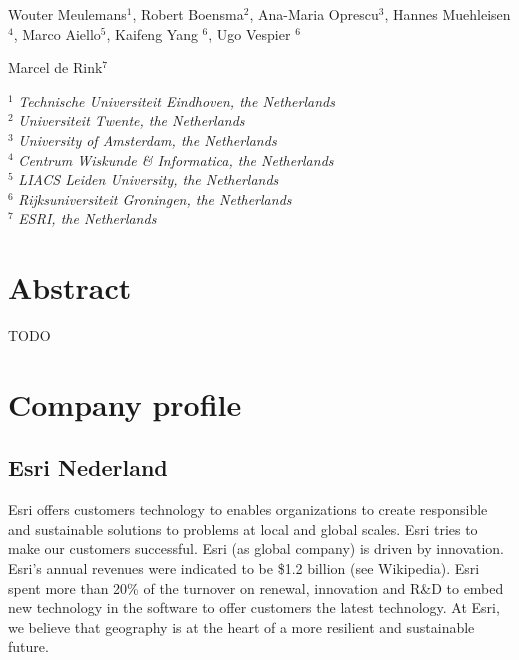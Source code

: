 \documentclass[a4paper,11pt]{article}
\begin{document}

\vspace{0.5em}


\vspace{2em}

\noindent Wouter Meulemans$^1$, Robert Boensma$^2$, Ana-Maria Oprescu$^3$, Hannes Muehleisen$^4$, Marco Aiello$^5$, Kaifeng Yang $^6$, Ugo Vespier $^6$

\vspace{1em}

\noindent Marcel de Rink$^7$

\vspace{1em}

\noindent $^1$ \emph{Technische Universiteit Eindhoven, the Netherlands}\\
\noindent $^2$ \emph{Universiteit Twente, the Netherlands}\\
\noindent $^3$ \emph{University of Amsterdam, the Netherlands}\\
\noindent $^4$ \emph{Centrum Wiskunde \& Informatica, the Netherlands}\\
\noindent $^5$ \emph{LIACS Leiden University, the Netherlands}\\
\noindent $^6$ \emph{Rijksuniversiteit Groningen, the Netherlands}\\
\noindent $^7$ \emph{ESRI, the Netherlands}

\section{Abstract}

TODO

\section{Company profile}

\subsection*{Esri Nederland}

Esri offers customers technology to enables organizations to create responsible and sustainable solutions to problems at local and global scales. Esri tries to make our customers successful.
Esri (as global company) is driven by innovation.
Esri's annual revenues were indicated to be \$1.2 billion (see Wikipedia).
Esri spent more than 20\% of the turnover on renewal, innovation and R\&D to embed new technology in the software to offer customers the latest technology.
At Esri, we believe that geography is at the heart of a more resilient and sustainable future.
\end{document}
